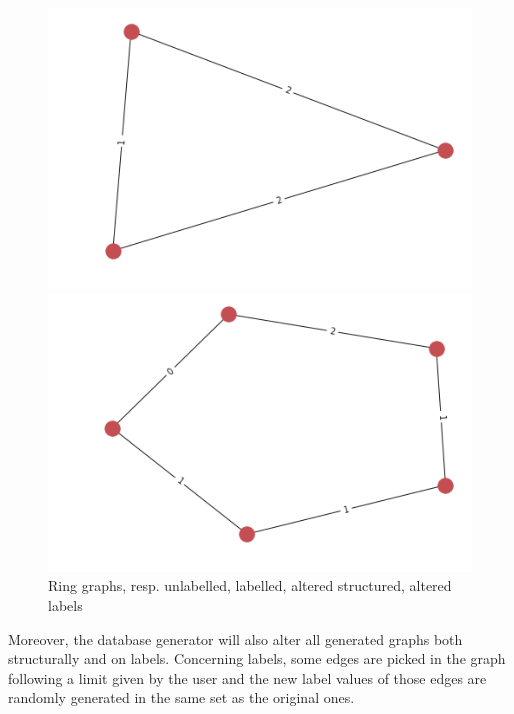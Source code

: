 \documentclass{article}
\theoremstyle{definition}
\begin{document}
\begin{figure}[!htb]
\begin{multicols}{4}
    \includegraphics[width=\linewidth]{data/generated-graphs/ring_altered_struct.png}\par
    \includegraphics[width=\linewidth]{data/generated-graphs/ring_altered_labels.png}\par
\end{multicols}
\caption{Ring graphs, resp. unlabelled, labelled, altered structured, altered labels}
\end{figure}
Moreover, the database generator will also alter all generated graphs both structurally and on labels. Concerning labels, some edges are picked in the graph following a limit given by the user and the new label values of those edges are randomly generated in the same set as the original ones.
\end{document}
